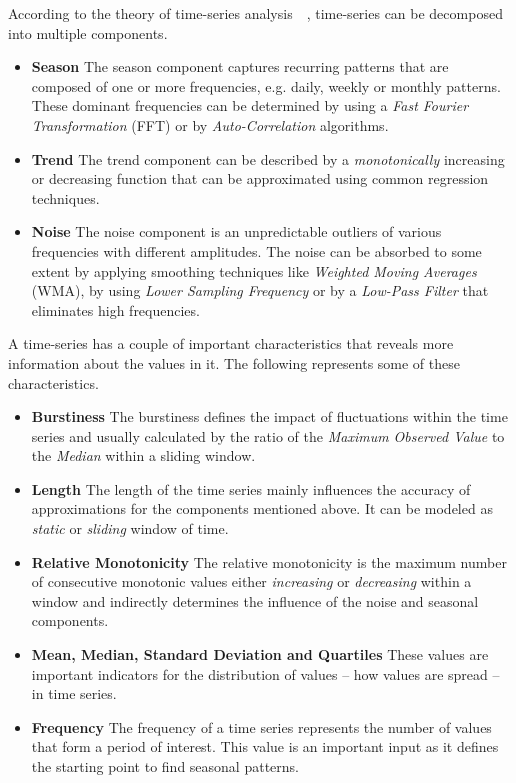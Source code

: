 According to the theory of time-series analysis~\cite{TSA}~\cite{Herbst:2013}, time-series can be decomposed into multiple components.
\begin{itemize}
    \item \textbf{Season} The season component captures recurring patterns that are composed of one or more frequencies, e.g. daily, weekly or monthly patterns. These dominant frequencies can be determined by using a \emph{Fast Fourier Transformation} (FFT) or by \emph{Auto-Correlation} algorithms.
    \item \textbf{Trend} The trend component can be described by a \emph{monotonically} increasing or decreasing function that can be approximated using common regression techniques.
    \item \textbf{Noise} The noise component is an unpredictable outliers of various frequencies with different amplitudes. The noise can be absorbed to some extent by applying smoothing techniques like \emph{Weighted Moving Averages} (WMA), by using \emph{Lower Sampling Frequency} or by a \emph{Low-Pass Filter} that eliminates high frequencies.
\end{itemize}

A time-series has a couple of important characteristics that reveals more information about the values in it. The following represents some of these characteristics.
\begin{itemize}
    \item \textbf{Burstiness} The burstiness defines the impact of fluctuations within the time series and usually calculated by the ratio of the \emph{Maximum Observed Value} to the \emph{Median} within a sliding
    window.
    \item \textbf{Length} The length of the time series mainly influences the accuracy of approximations for the components mentioned above. It can be modeled as \emph{static} or \emph{sliding} window of time.
    \item \textbf{Relative Monotonicity} The relative monotonicity is the maximum number of consecutive monotonic values either \emph{increasing} or \emph{decreasing} within a window and indirectly determines the influence of the noise and seasonal components.
    \item \textbf{Mean, Median, Standard Deviation and Quartiles} These values are important indicators for the distribution of values -- how values are spread -- in time series.
    \item \textbf{Frequency} The frequency of a time series represents the number of values that form a period of interest. This value is an important input as it defines the starting point to find seasonal patterns.
\end{itemize}

